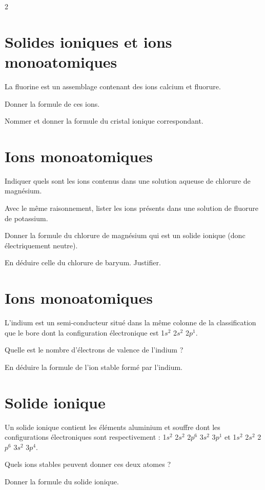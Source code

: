 \documentclass[a4paper,11pt,fleqn]{scrartcl}%
\begin{document}
\begin{multicols}{2}
\section{Solides ioniques et ions monoatomiques}
La fluorine est un assemblage contenant des ions calcium et fluorure.
	\begin{itemize*}
		\item Donner la formule de ces ions.
		\item Nommer et donner la formule du cristal ionique correspondant.
	\end{itemize*}

\section{Ions monoatomiques}
	\begin{itemize*}
		\item Indiquer quels sont les ions contenus dans une solution aqueuse de chlorure de magnésium.
		\item Avec le même raisonnement, lister les ions présents dans une solution de fluorure de potassium.
		\item Donner la formule du chlorure de magnésium qui est un solide ionique (donc électriquement neutre).
		\item En déduire celle du chlorure de baryum. Justifier.
	\end{itemize*}

\section{Ions monoatomiques}
L'indium est un semi-conducteur situé dans la même colonne de  la classification que le bore dont la configuration électronique est  1$s^2$ 2$s^2$ 2$p^1$.
	\begin{itemize*}
		\item Quelle est le nombre d'électrons de valence de l'indium ?
		\item En déduire la formule de l'ion stable formé par l'indium.
	\end{itemize*}

\section{Solide ionique}
Un solide ionique contient les éléments aluminium et souffre dont les configurations électroniques sont respectivement :  1$s^2$ 2$s^2$ 2$p^6$ 3$s^2$ 3$p^1$ et 1$s^2$ 2$s^2$ 2$p^6$ 3$s^2$ 3$p^4$.
	\begin{itemize*}
		\item Quels ions stables peuvent donner ces deux atomes ?
		\item Donner la formule du solide ionique.
	\end{itemize*}


\end{multicols}
\end{document}
